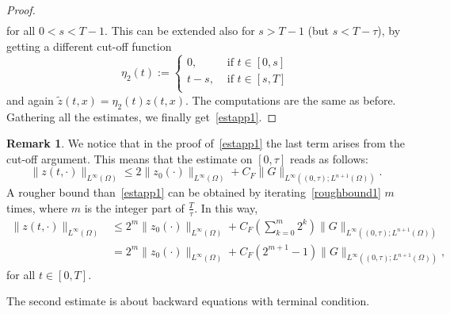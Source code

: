 \documentclass[10pt,a4paper,nouppercase,nowrite]{article}
\numberwithin{equation}{section}
\theoremstyle{definition}
\newtheorem{rmk}[defn]{Remark}
\begin{document}
\begin{proof}
\begin{multline*}
		\end{multline*}
		for all $0 < s < T-1$.
		This can be extended also for $s > T-1$ (but $s < T-\tau$), by getting a different cut-off function
		\begin{equation*}
			\eta_2(t):=
			\begin{cases}
				0,& \text{ if } t \in [0,s] \\
				t-s,& \text{ if } t \in [s,T] \\
			\end{cases}
		\end{equation*}
		and again $\tilde{z}(t,x)=\eta_2(t)z(t,x)$. The computations are the same as before. Gathering all the estimates, we finally get~\eqref{estapp1}.
	\end{proof}
	\begin{rmk} \label{roughrmk}
		We notice that in the proof of~\eqref{estapp1} the last term arises from the cut-off argument. This means that the estimate on $[0,\tau]$ reads as follows:
		\begin{equation} \label{roughbound1}
			\| z(t,\cdot) \|_{L^{\infty}(\Omega)} \le 2 \| z_0(\cdot) \|_{L^{\infty}(\Omega)} + C_F \| G \|_{L^{\infty}((0,\tau);L^{n+1}(\Omega))}.
		\end{equation}
	A rougher bound than~\eqref{estapp1} can be obtained by iterating~\eqref{roughbound1} $m$ times, where $m$ is the integer part of $\frac{T}{\tau}$. In this way,
	\begin{equation} \label{roughbound2}
		\begin{split}
		\| z(t,\cdot) \|_{L^{\infty}(\Omega)} &\le 2^m \| z_0(\cdot) \|_{L^{\infty}(\Omega)} + C_F \left( \sum_{k=0}^m 2^k \right) \| G \|_{L^{\infty}((0,\tau);L^{n+1}(\Omega))} \\
		& = 2^m \| z_0(\cdot) \|_{L^{\infty}(\Omega)} + C_F (2^{m+1}-1) \| G \|_{L^{\infty}((0,\tau);L^{n+1}(\Omega))},
		\end{split}
	\end{equation}
	for all $t \in [0,T]$.
	\end{rmk}
	The second estimate is about backward equations with terminal condition.
\end{document}

